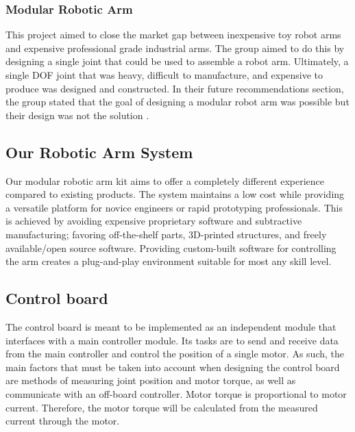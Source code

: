 \subsubsection{Modular Robotic Arm}
This project aimed to close the market gap between inexpensive toy robot arms and expensive professional grade industrial arms. The group aimed to do this by designing a single joint that could be used to assemble a robot arm. Ultimately, a single DOF joint that was heavy, difficult to manufacture, and expensive to produce was designed and constructed. In their future recommendations section, the group stated that the goal of designing a modular robot arm was possible but their design was not the solution \cite{MRA}.

\subsection{Our Robotic Arm System}
Our modular robotic arm kit aims to offer a completely different experience compared to existing products. The system maintains a low cost while providing a versatile platform for novice engineers or rapid prototyping professionals. This is achieved by avoiding expensive proprietary software and subtractive manufacturing; favoring off-the-shelf parts, 3D-printed structures, and freely available/open source software. Providing custom-built software for controlling the arm creates a plug-and-play environment suitable for most any skill level.


\subsection{Control board}
The control board is meant to be implemented as an independent module that interfaces with a main controller module. Its tasks are to send and receive data from the main controller and control the position of a single motor. As such, the main factors that must be taken into account when designing the control board are methods of measuring joint position and motor torque, as well as communicate with an off-board controller. Motor torque is proportional to motor current. Therefore, the motor torque will be calculated from the measured current through the motor.
